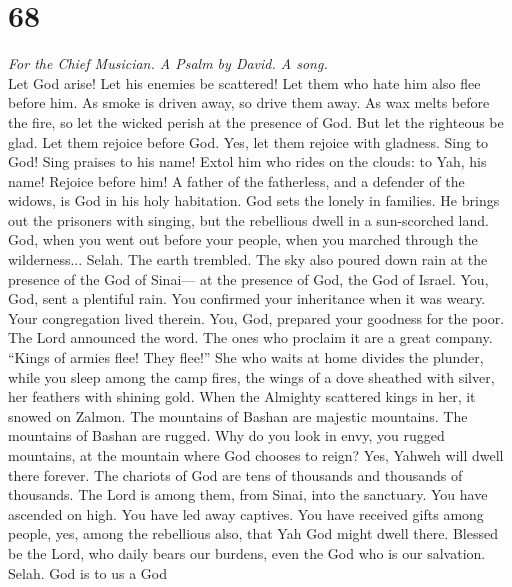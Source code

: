 \hypertarget{section-67}{%
\section{68}\label{section-67}}

\emph{For the Chief Musician. A Psalm by David. A song.}\\
 Let God arise! Let his enemies be scattered! Let them who
hate him also flee before him.  As smoke is driven away,
so drive them away. As wax melts before the fire, so let the wicked
perish at the presence of God.  But let the righteous be
glad. Let them rejoice before God. Yes, let them rejoice with gladness.
 Sing to God! Sing praises to his name! Extol him who
rides on the clouds: to Yah, his name! Rejoice before him!
 A father of the fatherless, and a defender of the widows,
is God in his holy habitation.  God sets the lonely in
families. He brings out the prisoners with singing, but the rebellious
dwell in a sun-scorched land.  God, when you went out
before your people, when you marched through the wilderness... Selah.
 The earth trembled. The sky also poured down rain at the
presence of the God of Sinai--- at the presence of God, the God of
Israel.  You, God, sent a plentiful rain. You confirmed
your inheritance when it was weary.  Your congregation
lived therein. You, God, prepared your goodness for the poor.
 The Lord announced the word. The ones who proclaim it
are a great company.  ``Kings of armies flee! They
flee!'' She who waits at home divides the plunder,  while
you sleep among the camp fires, the wings of a dove sheathed with
silver, her feathers with shining gold.  When the
Almighty scattered kings in her, it snowed on Zalmon. 
The mountains of Bashan are majestic mountains. The mountains of Bashan
are rugged.  Why do you look in envy, you rugged
mountains, at the mountain where God chooses to reign? Yes, Yahweh will
dwell there forever.  The chariots of God are tens of
thousands and thousands of thousands. The Lord is among them, from
Sinai, into the sanctuary.  You have ascended on high.
You have led away captives. You have received gifts among people, yes,
among the rebellious also, that Yah God might dwell there.
 Blessed be the Lord, who daily bears our burdens, even
the God who is our salvation. Selah.  God is to us a God
